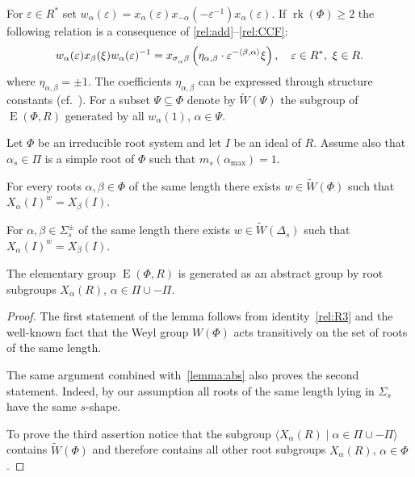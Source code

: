 \documentclass[12pt]{amsart}
\numberwithin{equation}{section}
\theoremstyle{definition}
\DeclareMathOperator{\E}{E}
\DeclareMathOperator{\rk}{rk}
\def\ssub#1{\mathchoice
   {_{\lower2pt\hbox{$\scriptstyle #1$}}}
   {_{\lower2pt\hbox{$\scriptstyle #1$}}}
   {_{\lower1.5pt\hbox{$\scriptscriptstyle #1$}}}
   {_{\!\lower1.5pt\hbox{$\scriptscriptstyle #1$}}}}
\begin{document}
For $\varepsilon\in R^*$ set $w_\alpha(\varepsilon) = x_\alpha(\varepsilon) x_{-\alpha}(-\varepsilon^{-1}) x_{\alpha}(\varepsilon).$
If $\rk(\Phi)\geqslant 2$ the following relation is a consequence of \ref{rel:add}--\ref{rel:CCF}:
\begin{equation}\label{rel:R3}
w_\alpha(\varepsilon) x_{\beta}(\xi) w_\alpha(\varepsilon)^{-1} =
x_{\sigma\ssub{\alpha}\beta} \left(\eta_{\alpha, \beta}\cdot\varepsilon^{-\langle\beta,\alpha \rangle}\xi\right),\quad \varepsilon\in R^*,\ \xi\in R.
\end{equation}
where $\eta_{\alpha, \beta}=\pm 1$. The coefficients $\eta_{\alpha, \beta}$ can be expressed through structure constants (cf.~\cite[\S13]{VP}).
For a subset $\Psi \subseteq \Phi$ denote by $\widetilde{W}(\Psi)$ the subgroup of $\E(\Phi, R)$ generated by all $w_{\alpha}(1)$, $\alpha \in \Psi$.
\begin{lemma} \label{lemma:weylfacts} Let $\Phi$ be an irreducible root system and let $I$ be an ideal of $R$. Assume also that $\alpha_s\in \Pi$ is a simple root of $\Phi$ such that $m_s(\alpha_\mathrm{max}) = 1$.
\begin{thmlist}
\item \label{item-trans1} For every roots $\alpha, \beta \in \Phi$ of the same length there exists $w \in \widetilde{W}(\Phi)$ such that $X_{\alpha}(I)^w = X_\beta(I)$.
\item \label{item-trans2} For $\alpha, \beta \in \Sigma^\pm_s$ of the same length there exists $w\in \widetilde{W}(\Delta_s)$ such that $X_\alpha(I)^w = X_\beta(I)$.
\item \label{item-egen} The elementary group $\E(\Phi, R)$  is generated as an abstract group by root subgroups $X_{\alpha}(R)$, $\alpha \in \Pi \cup -\Pi$.
\end{thmlist}
\end{lemma}
\begin{proof}
The first statement of the lemma follows from identity~\ref{rel:R3} and the well-known fact that the Weyl group $W(\Phi)$ acts transitively on the set of roots of the same length.
 
The same argument combined with~\cref{lemma:abs} also proves the second statement. Indeed, by our assumption all roots of the same length lying in $\Sigma_s$ have the same $s$-shape.
 
To prove the third assertion notice that the subgroup $\langle X_\alpha(R) \mid \alpha \in \Pi \cup -\Pi \rangle$ contains $\widetilde{W}(\Phi)$ and therefore contains all other root subgroups $X_\alpha(R)$, $\alpha\in \Phi$. \end{proof}
\end{document}

